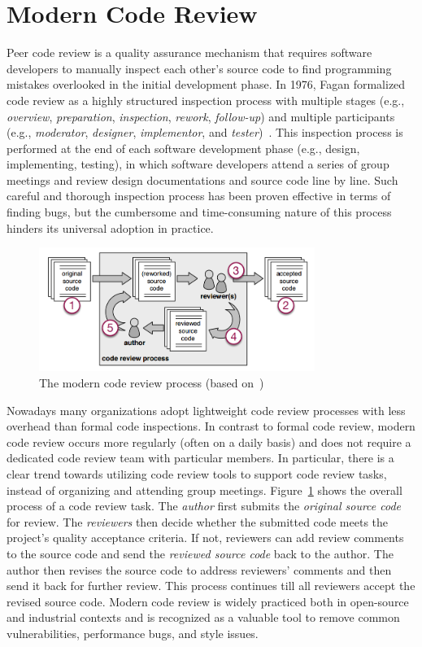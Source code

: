 \documentclass[11pt]{article}
\begin{document}
\section{Modern Code Review}

Peer code review is a quality assurance mechanism that requires software developers to manually inspect each other's source code to find programming mistakes overlooked in the initial development phase. In 1976, Fagan formalized code review as a highly structured inspection process with multiple stages (e.g., {\em overview}, {\em preparation}, {\em inspection}, {\em rework}, {\em follow-up}) and multiple participants (e.g., {\em moderator}, {\em designer}, {\em implementor}, and {\em tester})~\cite{fagan2001design}. This inspection process is performed at the end of each software development phase (e.g., design, implementing, testing), in which software developers attend a series of group meetings and review design documentations and source code line by line. Such careful and thorough inspection process has been proven effective in terms of finding bugs, but the cumbersome and time-consuming nature of this process hinders its universal adoption in practice. 

\begin{figure}[ht]
 \centering
 \includegraphics[width=0.8\textwidth]{review-process.png}
 \caption{The modern code review process (based on~\cite{beller2014modern})}
 \label{fig:review-process}
\end{figure}

Nowadays many organizations adopt lightweight code review processes with less overhead than formal code inspections. In contrast to formal code review, modern code review occurs more regularly (often on a daily basis) and does not require a dedicated code review team with particular members. In particular, there is a clear trend towards utilizing code review tools to support code review tasks, instead of organizing and attending group meetings. Figure~\ref{fig:review-process} shows the overall process of a code review task. The {\em author} first submits the {\em original source code} for review. The {\em reviewers} then decide whether the submitted code meets the project's quality acceptance criteria. If not, reviewers can add review comments to the source code and send the {\em reviewed source code} back to the author. The author then revises the source code to address reviewers' comments and then send it back for further review. This process continues till all reviewers accept the revised source code. Modern code review is widely practiced both in open-source and industrial contexts and is recognized as a valuable tool to remove common vulnerabilities, performance bugs, and style issues. 
\end{document}
